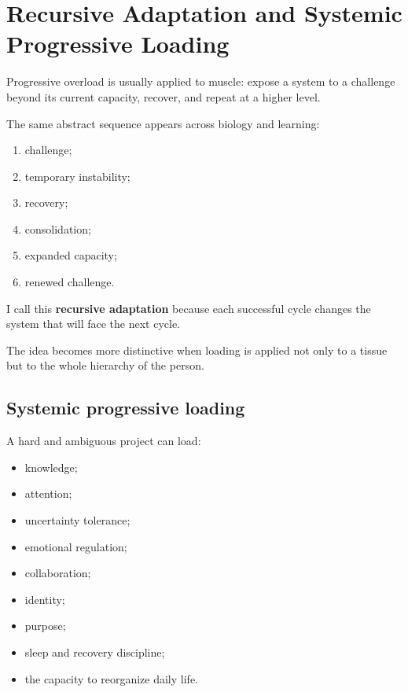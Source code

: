 \chapter{Recursive Adaptation and Systemic Progressive Loading}

Progressive overload is usually applied to muscle: expose a system to a challenge beyond its current capacity, recover, and repeat at a higher level.

The same abstract sequence appears across biology and learning:

\begin{enumerate}
\def\labelenumi{\arabic{enumi}.}
\tightlist
\item
  challenge;
\item
  temporary instability;
\item
  recovery;
\item
  consolidation;
\item
  expanded capacity;
\item
  renewed challenge.
\end{enumerate}

I call this \textbf{recursive adaptation} because each successful cycle changes the system that will face the next cycle.

The idea becomes more distinctive when loading is applied not only to a tissue but to the whole hierarchy of the person.

\section{Systemic progressive loading}

A hard and ambiguous project can load:

\begin{itemize}
\tightlist
\item
  knowledge;
\item
  attention;
\item
  uncertainty tolerance;
\item
  emotional regulation;
\item
  collaboration;
\item
  identity;
\item
  purpose;
\item
  sleep and recovery discipline;
\item
  the capacity to reorganize daily life.
\end{itemize}

